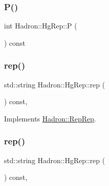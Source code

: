 \mbox{\label{structHadron_1_1HgRep_a56e901b36f34730192413d29c8c4c4a5}} 
\subsubsection{\texorpdfstring{P()}{P()}\hspace{0.1cm}{\footnotesize\ttfamily [2/2]}}
{\footnotesize\ttfamily int Hadron\+::\+Hg\+Rep\+::P (\begin{DoxyParamCaption}{ }\end{DoxyParamCaption}) const\hspace{0.3cm}{\ttfamily [inline]}}

\mbox{\label{structHadron_1_1HgRep_a229b19e7f1d4fa443b715de9b5ed4454}} 
\subsubsection{\texorpdfstring{rep()}{rep()}\hspace{0.1cm}{\footnotesize\ttfamily [1/5]}}
{\footnotesize\ttfamily std\+::string Hadron\+::\+Hg\+Rep\+::rep (\begin{DoxyParamCaption}{ }\end{DoxyParamCaption}) const\hspace{0.3cm}{\ttfamily [inline]}, {\ttfamily [virtual]}}



Implements \mbox{\hyperlink{structHadron_1_1RepRep_ab3213025f6de249f7095892109575fde}{Hadron\+::\+Rep\+Rep}}.

\mbox{\label{structHadron_1_1HgRep_a229b19e7f1d4fa443b715de9b5ed4454}} 
\subsubsection{\texorpdfstring{rep()}{rep()}\hspace{0.1cm}{\footnotesize\ttfamily [2/5]}}
{\footnotesize\ttfamily std\+::string Hadron\+::\+Hg\+Rep\+::rep (\begin{DoxyParamCaption}{ }\end{DoxyParamCaption}) const\hspace{0.3cm}{\ttfamily [inline]}, {\ttfamily [virtual]}}



